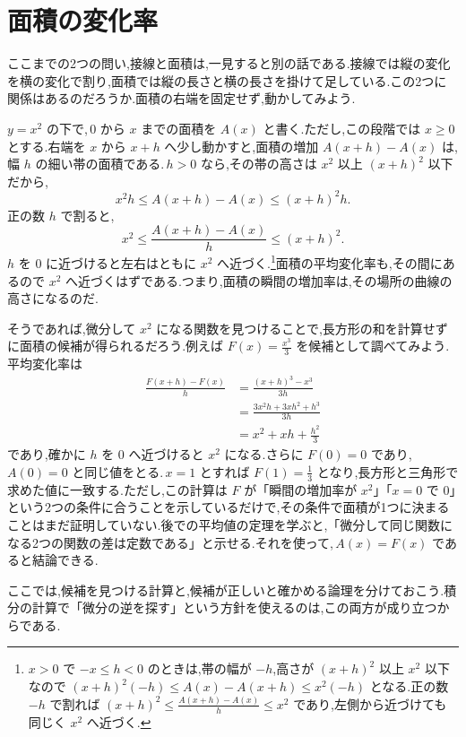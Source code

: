 \section{面積の変化率}\label{節:導入基本定理}
ここまでの2つの問い,接線と面積は,一見すると別の話である.接線では縦の変化を横の変化で割り,面積では縦の長さと横の長さを掛けて足している.この2つに関係はあるのだろうか.面積の右端を固定せず,動かしてみよう.

$y=x^2$ の下で,\,$0$ から $x$ までの面積を $A(x)$ と書く.ただし,この段階では $x\ge0$ とする.右端を $x$ から $x+h$ へ少し動かすと,面積の増加 $A(x+h)-A(x)$ は,幅 $h$ の細い帯の面積である.\,$h>0$ なら,その帯の高さは $x^2$ 以上 $(x+h)^2$ 以下だから,
\[
 x^2h\le A(x+h)-A(x)\le(x+h)^2h.
\]
正の数 $h$ で割ると,
\[
 x^2\le\frac{A(x+h)-A(x)}h\le(x+h)^2.
\]
$h$ を $0$ に近づけると左右はともに $x^2$ へ近づく.\footnote{$x>0$ で $-x\le h<0$ のときは,帯の幅が $-h$,高さが $(x+h)^2$ 以上 $x^2$ 以下なので $(x+h)^2(-h)\le A(x)-A(x+h)\le x^2(-h)$ となる.正の数 $-h$ で割れば $(x+h)^2\le\frac{A(x+h)-A(x)}h\le x^2$ であり,左側から近づけても同じく $x^2$ へ近づく.}面積の平均変化率も,その間にあるので $x^2$ へ近づくはずである.つまり,面積の瞬間の増加率は,その場所の曲線の高さになるのだ.

そうであれば,微分して $x^2$ になる関数を見つけることで,長方形の和を計算せずに面積の候補が得られるだろう.例えば $F(x)=\frac{x^3}{3}$ を候補として調べてみよう.平均変化率は
\begin{align*}
 \frac{F(x+h)-F(x)}h
 &=\frac{(x+h)^3-x^3}{3h}\\
 &=\frac{3x^2h+3xh^2+h^3}{3h}\\
 &=x^2+xh+\frac{h^2}{3}
\end{align*}
であり,確かに $h$ を $0$ へ近づけると $x^2$ になる.さらに $F(0)=0$ であり,\,$A(0)=0$ と同じ値をとる.\,$x=1$ とすれば $F(1)=\frac13$ となり,長方形と三角形で求めた値に一致する.ただし,この計算は $F$ が「瞬間の増加率が $x^2$」「$x=0$ で $0$」という2つの条件に合うことを示しているだけで,その条件で面積が1つに決まることはまだ証明していない.後での平均値の定理を学ぶと,「微分して同じ関数になる2つの関数の差は定数である」と示せる.それを使って,\,$A(x)=F(x)$ であると結論できる.

ここでは,候補を見つける計算と,候補が正しいと確かめる論理を分けておこう.積分の計算で「微分の逆を探す」という方針を使えるのは,この両方が成り立つからである.
